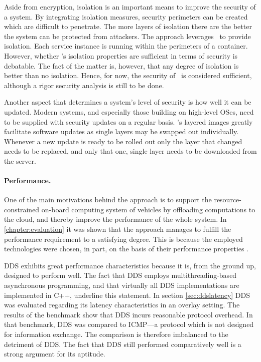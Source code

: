Aside from encryption, isolation is an important means to improve the security of a system. By integrating isolation measures, security perimeters can be created which are difficult to penetrate. The more layers of isolation there are the better the system can be protected from attackers. The approach leverages \docker\ to provide isolation. Each service instance is running within the perimeters of a container. However, whether \docker 's isolation properties are sufficient in terms of security is debatable. The fact of the matter is, however, that any degree of isolation is better than no isolation. Hence, for now, the security of \docker\ is considered sufficient, although a rigor security analysis is still to be done.

Another aspect that determines a system's level of security is how well it can be updated. Modern systems, and especially those building on high-level OSes, need to be supplied with security updates on a regular basis. \docker 's layered images greatly facilitate software updates as single layers may be swapped out individually. Whenever a new update is ready to be rolled out only the layer that changed needs to be replaced, and only that one, single layer needs to be downloaded from the server.

\paragraph{Performance.}
One of the main motivations behind the approach is to support the resource-constrained on-board computing system of vehicles by offloading computations to the cloud, and thereby improve the performance of the whole system. In \autoref{chapter:evaluation} it was shown that the approach manages to fulfill the performance requirement to a satisfying degree. This is because the employed technologies were chosen, in part, on the basis of their performance properties .

DDS exhibits great performance characteristics because it is, from the ground up, designed to perform well. The fact that DDS employs multithreading-based asynchronous programming, and that virtually all DDS implementations are implemented in C++, underline this statement. In section \ref{sec:ddslatency} DDS was evaluated regarding its latency characteristics in an overlay setting. The results of the benchmark show that DDS incurs reasonable protocol overhead. In that benchmark, DDS was compared to ICMP---a protocol which is not designed for information exchange. The comparison is therefore imbalanced to the detriment of DDS. The fact that DDS still performed comparatively well is a strong argument for its aptitude. 

